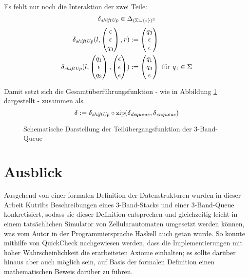 \documentclass{article}
\DeclareMathOperator{\zip}{zip}
\begin{document}
Es fehlt nur noch die Interaktion der zwei Teile:
\[ \delta_\mathit{shiftUp} \in \Delta_{(\Sigma \cup \{\epsilon\})^3} \]
\begin{align*}
    \delta_\mathit{shiftUp}(l,\begin{pmatrix}\epsilon\\\epsilon\\q_3\end{pmatrix},r) &:= \begin{pmatrix}q_3\\\epsilon\\\epsilon\end{pmatrix} \\
    \delta_\mathit{shiftUp}(l,\begin{pmatrix}q_1\\\epsilon\\q_3\end{pmatrix},\begin{pmatrix}\epsilon\\\epsilon\\\epsilon\end{pmatrix}) &:= \begin{pmatrix}q_1\\q_3\\\epsilon\end{pmatrix} \text{ für } q_1 \in \Sigma
\end{align*}

Damit setzt sich die Gesamtüberführungsfunktion - wie in Abbildung \ref{fig3tapequeue} dargestellt - zusammen als
\[ \delta := \delta_\shiftUp \circ \zip(\delta_\dequeue,\delta_\enqueue) \]
\begin{figure}[h]
    \centering
    \caption{Schematische Darstellung der Teilübergangsfunktion der 3-Band-Queue}
    \label{fig3tapequeue}
\end{figure}

\newpage
\section{Ausblick}
Ausgehend von einer formalen Definition der Datenstrukturen wurden in dieser Arbeit Kutribs Beschreibungen eines 3-Band-Stacks und einer 3-Band-Queue konkretisiert, sodass sie dieser Definition entsprechen und gleichzeitig leicht in einem tatsächlichen Simulator von Zellularautomaten umgesetzt werden können, was vom Autor in der Programmiersprache Haskell auch getan wurde. So konnte mithilfe von QuickCheck nachgewiesen werden, dass die Implementierungen mit hoher Wahrscheinlichkeit die erarbeiteten Axiome einhalten; es sollte darüber hinaus aber auch möglich sein, auf Basis der formalen Definition einen mathematischen Beweis darüber zu führen.
\end{document}
